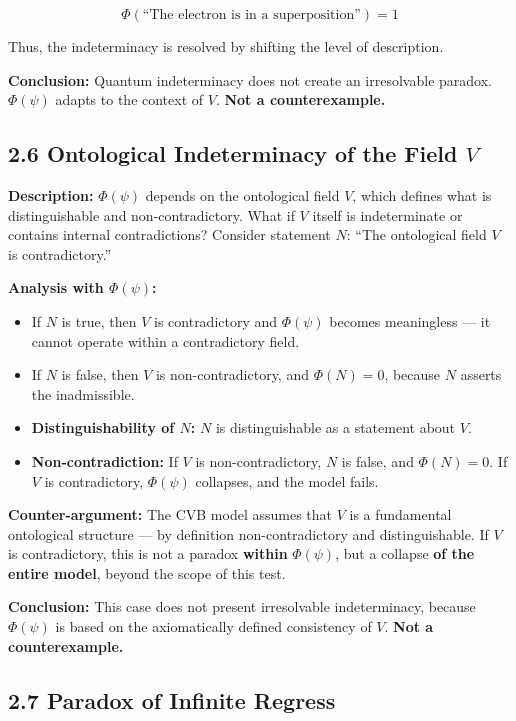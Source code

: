 \documentclass[12pt]{article}
\begin{document}
\[
\Phi(\text{``The electron is in a superposition''}) = 1
\]

Thus, the indeterminacy is resolved by shifting the level of description.

\textbf{Conclusion:} Quantum indeterminacy does not create an irresolvable paradox. $\Phi(\psi)$ adapts to the context of $V$. \textbf{Not a counterexample.}

\subsection*{2.6 Ontological Indeterminacy of the Field $V$}

\textbf{Description:}  
$\Phi(\psi)$ depends on the ontological field $V$, which defines what is distinguishable and non-contradictory.  
What if $V$ itself is indeterminate or contains internal contradictions?  
Consider statement $N$: ``The ontological field $V$ is contradictory.''

\textbf{Analysis with $\Phi(\psi)$:}

\begin{itemize}
\item If $N$ is true, then $V$ is contradictory and $\Phi(\psi)$ becomes meaningless — it cannot operate within a contradictory field.
\item If $N$ is false, then $V$ is non-contradictory, and $\Phi(N) = 0$, because $N$ asserts the inadmissible.
\item \textbf{Distinguishability of $N$:} $N$ is distinguishable as a statement about $V$.
\item \textbf{Non-contradiction:} If $V$ is non-contradictory, $N$ is false, and $\Phi(N) = 0$.  
If $V$ is contradictory, $\Phi(\psi)$ collapses, and the model fails.
\end{itemize}

\textbf{Counter-argument:}  
The CVB model assumes that $V$ is a fundamental ontological structure — by definition non-contradictory and distinguishable.  
If $V$ is contradictory, this is not a paradox \textbf{within} $\Phi(\psi)$, but a collapse \textbf{of the entire model}, beyond the scope of this test.

\textbf{Conclusion:} This case does not present irresolvable indeterminacy, because $\Phi(\psi)$ is based on the axiomatically defined consistency of $V$. \textbf{Not a counterexample.}

\subsection*{2.7 Paradox of Infinite Regress}
\end{document}
